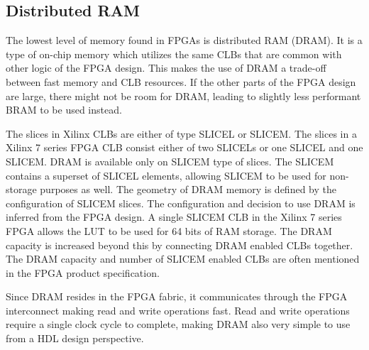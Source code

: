 \documentclass[12pt]{report}
\begin{document}
\subsection{Distributed RAM}
The lowest level of memory found in FPGAs is distributed RAM (DRAM). It is a type of on-chip memory which utilizes the same CLBs that are common with other logic of the FPGA design. This makes the use of DRAM a trade-off between fast memory and CLB resources. If the other parts of the FPGA design are large, there might not be room for DRAM, leading to slightly less performant BRAM to be used instead.
\par
The slices in Xilinx CLBs are either of type SLICEL or SLICEM. The slices in a Xilinx 7 series FPGA CLB consist either of two SLICELs or one SLICEL and one SLICEM. DRAM is available only on SLICEM type of slices. The SLICEM contains a superset of SLICEL elements, allowing SLICEM to be used for non-storage purposes as well. The geometry of DRAM memory is defined by the configuration of SLICEM slices. The configuration and decision to use DRAM is inferred from the FPGA design. A single SLICEM CLB in the Xilinx 7 series FPGA allows the LUT to be used for 64 bits of RAM storage. The DRAM capacity is increased beyond this by connecting DRAM enabled CLBs together. The DRAM capacity and number of SLICEM enabled CLBs are often mentioned in the FPGA product specification. \citep{XilClbMan} 
\par
Since DRAM resides in the FPGA fabric, it communicates through the FPGA interconnect making read and write operations fast. Read and write operations require a single clock cycle to complete, making DRAM also very simple to use from a HDL design perspective. \citep{XilMemMan}  
\end{document}

